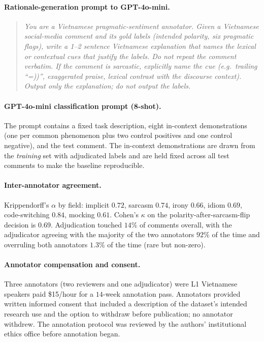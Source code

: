 \paragraph{Rationale-generation prompt to GPT-4o-mini.}
\begin{quote}\itshape\small
You are a Vietnamese pragmatic-sentiment annotator. Given a
Vietnamese social-media comment and its gold labels (intended
polarity, six pragmatic flags), write a 1--2 sentence Vietnamese
explanation that names the lexical or contextual cues that justify
the labels. Do not repeat the comment verbatim. If the comment is
sarcastic, explicitly name the cue (e.g.\ trailing ``=))'',
exaggerated praise, lexical contrast with the discourse context).
Output only the explanation; do not output the labels.
\end{quote}

\paragraph{GPT-4o-mini classification prompt (8-shot).}
The prompt contains a fixed task description, eight in-context
demonstrations (one per common phenomenon plus two control
positives and one control negative), and the test comment. The
in-context demonstrations are drawn from the \method{} \emph{training}
set with adjudicated labels and are held fixed across all test
comments to make the baseline reproducible.

\paragraph{Inter-annotator agreement.}
Krippendorff's $\alpha$ by field:
implicit $0.72$, sarcasm $0.74$, irony $0.66$, idiom $0.69$,
code-switching $0.84$, mocking $0.61$.
Cohen's $\kappa$ on the polarity-after-sarcasm-flip decision is
$0.69$. Adjudication touched $14\%$ of comments overall, with the
adjudicator agreeing with the majority of the two annotators
$92\%$ of the time and overruling both annotators $1.3\%$ of the
time (rare but non-zero).

\paragraph{Annotator compensation and consent.}
Three annotators (two reviewers and one adjudicator) were L1
Vietnamese speakers paid \$15/hour for a $14$-week annotation pass.
Annotators provided written informed consent that included a
description of the dataset's intended research use and the option to
withdraw before publication; no annotator withdrew. The annotation
protocol was reviewed by the authors' institutional ethics office
before annotation began.
